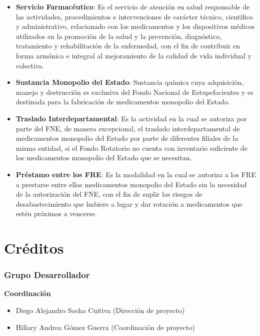 \documentclass[
]{book}
\begin{document}
\begin{itemize}
\item
  \textbf{Servicio Farmacéutico}: Es el servicio de atención en salud responsable de las actividades, procedimientos e intervenciones de carácter técnico, científico y administrativo, relacionado con los medicamentos y los dispositivos médicos utilizados en la promoción de la salud y la prevención, diagnóstico, tratamiento y rehabilitación de la enfermedad, con el fin de contribuir en forma armónica e integral al mejoramiento de la calidad de vida individual y colectiva.
\item
  \textbf{Sustancia Monopolio del Estado}: Sustancia química cuya adquisición, manejo y destrucción es exclusiva del Fondo Nacional de Estupefacientes y es destinada para la fabricación de medicamentos monopolio del Estado.
\item
  \textbf{Traslado Interdepartamental}: Es la actividad en la cual se autoriza por parte del FNE, de manera excepcional, el traslado interdepartamental de medicamentos monopolio del Estado por parte de diferentes filiales de la misma entidad, si el Fondo Rotatorio no cuenta con inventario suficiente de los medicamentos monopolio del Estado que se necesitan.
\item
  \textbf{Préstamo entre los FRE}: Es la modalidad en la cual se autoriza a los FRE a prestarse entre ellos medicamentos monopolio del Estado sin la necesidad de la autorización del FNE, con el fin de suplir los riesgos de desabastecimiento que hubiere a lugar y dar rotación a medicamentos que estén próximos a vencerse.
\end{itemize}

\hypertarget{cruxe9ditos}{%
\chapter*{Créditos}\label{cruxe9ditos}}

\hypertarget{grupo-desarrollador}{%
\subsection*{Grupo Desarrollador}\label{grupo-desarrollador}}

\textbf{Coordinación}

\begin{itemize}\item  Diego Alejandro Socha Cuitiva (Dirección de proyecto)\item  Hillary Andrea Gómez Guerra (Coordinación de proyecto)\end{itemize}
\end{document}
